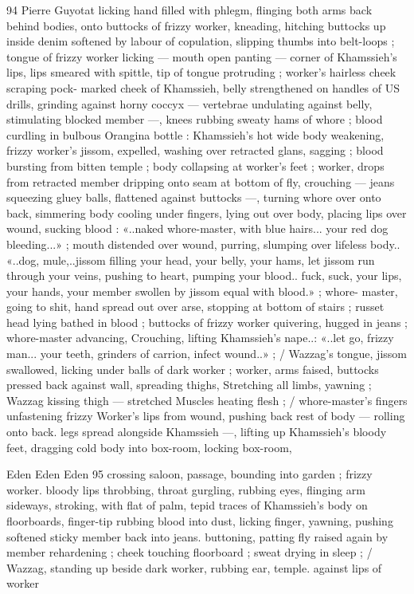 94 Pierre Guyotat
licking hand filled with phlegm, flinging both arms back behind
bodies, onto buttocks of frizzy worker, kneading, hitching buttocks
up inside denim softened by labour of copulation, slipping thumbs
into belt-loops ; tongue of frizzy worker licking — mouth open
panting — corner of Khamssieh’s lips, lips smeared with spittle, tip
of tongue protruding ; worker's hairless cheek scraping pock-
marked cheek of Khamssieh, belly strengthened on handles of US
drills, grinding against horny coccyx — vertebrae undulating against
belly, stimulating blocked member —, knees rubbing sweaty hams of
whore ; blood curdling in bulbous Orangina bottle : Khamssieh’s hot
wide body weakening, frizzy worker's jissom, expelled, washing over
retracted glans, sagging ; blood bursting from bitten temple ; body
collapsing at worker's feet ; worker, drops from retracted member
dripping onto seam at bottom of fly, crouching — jeans squeezing
gluey balls, flattened against buttocks —, turning whore over onto
back, simmering body cooling under fingers, lying out over body,
placing lips over wound, sucking blood : «..naked whore-master, with
blue hairs... your red dog bleeding...» ; mouth distended over wound,
purring, slumping over lifeless body.. «..dog, mule,..jissom filling
your head, your belly, your hams, let jissom run through your veins,
pushing to heart, pumping your blood.. fuck, suck, your lips, your
hands, your member swollen by jissom equal with blood.» ; whore-
master, going to shit, hand spread out over arse, stopping at bottom
of stairs ; russet head lying bathed in blood ; buttocks of frizzy
worker quivering, hugged in jeans ; whore-master advancing,
Crouching, lifting Khamssieh's nape..: «..let go, frizzy man... your
teeth, grinders of carrion, infect wound..» ; / Wazzag's tongue,
jissom swallowed, licking under balls of dark worker ; worker, arms
faised, buttocks pressed back against wall, spreading thighs,
Stretching all limbs, yawning ; Wazzag kissing thigh — stretched
Muscles heating flesh ; / whore-master’s fingers unfastening frizzy
Worker's lips from wound, pushing back rest of body — rolling onto
back. legs spread alongside Khamssieh —, lifting up Khamssieh's
bloody feet, dragging cold body into box-room, locking box-room,

Eden Eden Eden 95
crossing saloon, passage, bounding into garden ; frizzy worker.
bloody lips throbbing, throat gurgling, rubbing eyes, flinging arm
sideways, stroking, with flat of palm, tepid traces of Khamssieh’s
body on floorboards, finger-tip rubbing blood into dust, licking
finger, yawning, pushing softened sticky member back into jeans.
buttoning, patting fly raised again by member rehardening ; cheek
touching floorboard ; sweat drying in sleep ; / Wazzag, standing up
beside dark worker, rubbing ear, temple. against lips of worker

